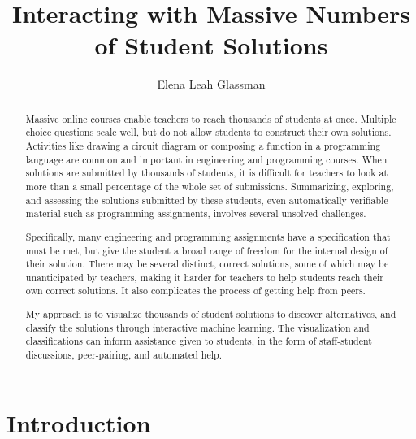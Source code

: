 \documentclass{sigchi}
\begin{document}
\title{Interacting with Massive Numbers of Student Solutions}

\author{
  \alignauthor Elena Leah Glassman
}

\maketitle

\begin{abstract}
Massive online courses enable teachers to reach thousands of students at once. Multiple choice questions scale well, but do not allow students to construct their own solutions. Activities like drawing a circuit diagram or composing a function in a programming language are common and important in engineering and programming courses. When solutions are submitted by thousands of students, it is difficult for teachers to look at more than a small percentage of the whole set of submissions. Summarizing, exploring, and assessing the solutions submitted by these students, even automatically-verifiable material such as programming assignments, involves several unsolved challenges. 

Specifically, many engineering and programming assignments have a specification that must be met, but give the student a broad range of freedom for the internal design of their solution. There may be several distinct, correct solutions, some of which may be unanticipated by teachers, making it harder for teachers to help students reach their own correct solutions. It also complicates the process of getting help from peers. 

My approach is to visualize thousands of student solutions to discover alternatives, and classify the solutions through interactive machine learning. The visualization and classifications can inform assistance given to students, in the form of staff-student discussions, peer-pairing, and automated help.
\end{abstract}



\section{Introduction}
\end{document}
